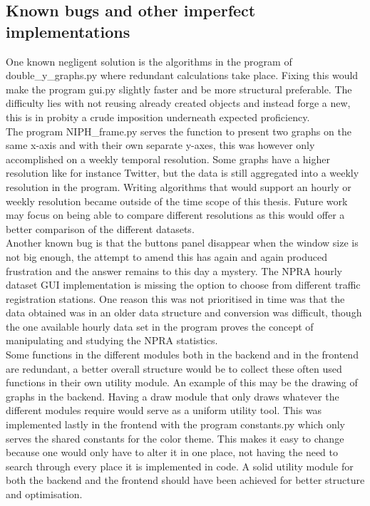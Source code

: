 \subsection{Known bugs and other imperfect implementations}
One known negligent solution is the algorithms in the program of double\_y\_graphs.py where redundant calculations take place. Fixing this would make the program gui.py slightly faster and be more structural preferable. The difficulty lies with not reusing already created objects and instead forge a new, this is in probity a crude imposition underneath expected proficiency.\\
The program NIPH\_frame.py serves the function to present two graphs on the same x-axis and with their own separate y-axes, this was however only accomplished on a weekly temporal resolution. Some graphs have a higher resolution like for instance Twitter, but the data is still aggregated into a weekly resolution in the program. Writing algorithms that would support an hourly or weekly resolution became outside of the time scope of this thesis. Future work may focus on being able to compare different resolutions as this would offer a better comparison of the different datasets.\\
Another known bug is that the buttons panel disappear when the window size is not big enough, the attempt to amend this has again and again produced frustration and the answer remains to this day a mystery.
The NPRA hourly dataset GUI implementation is missing the option to choose from different traffic registration stations. One reason this was not prioritised in time was that the data obtained was in an older data structure and conversion was difficult, though the one available hourly data set in the program proves the concept of manipulating and studying the NPRA statistics.\\
Some functions in the different modules both in the backend and in the frontend are redundant, a better overall structure would be to collect these often used functions in their own utility module. An example of this may be the drawing of graphs in the backend. Having a draw module that only draws whatever the different modules require would serve as a uniform utility tool. This was implemented lastly in the frontend with the program constants.py which only serves the shared constants for the color theme. This makes it easy to change because one would only have to alter it in one place, not having the need to search through every place it is implemented in code. A solid utility module for both the backend and the frontend should have been achieved for better structure and optimisation.

